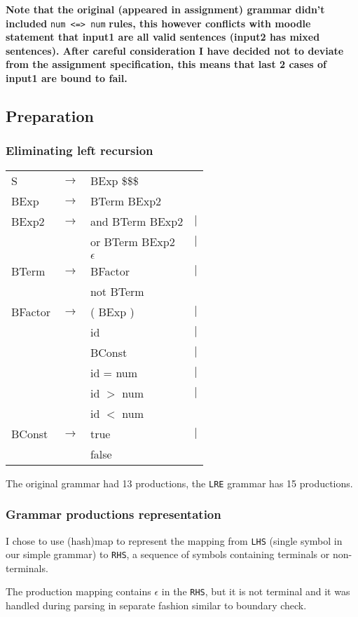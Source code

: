 \documentclass[%
 aip,
 jmp,%
 amsmath,amssymb,
 reprint,%
]{revtex4-1}
\begin{document}
\textbf{Note that the original (appeared in assignment) grammar didn't included }\texttt{num <=> num}\textbf{ rules, this however conflicts with moodle statement that input1 are all valid sentences (input2 has mixed sentences). After careful consideration I have decided not to deviate from the assignment specification, this means that last 2 cases of input1 are bound to fail. }\label{note:rant}
\subsection{Preparation}
\subsubsection{Eliminating left recursion}
\begin{tabular}{lclr}
S	&$\rightarrow$& BExp \$\$\$			&\\
BExp	&$\rightarrow$& BTerm BExp2		&\\
BExp2	&$\rightarrow$& and BTerm BExp2	&$|$\\
		&&		or BTerm	 BExp2			&$|$\\
		&&		$\epsilon$				&\\
BTerm	&$\rightarrow$&	BFactor			&$|$\\
		&&		not BTerm				&\\
BFactor	&$\rightarrow$& ( BExp )			&$|$\\
		&&	   	id						&$|$\\
		&&	   	BConst					&$|$\\
		&&	   	id = num					&$|$\\
		&&	   	id $>$ num				&$|$\\
		&&	   	id $<$ num				&\\
BConst	&$\rightarrow$& true				&$|$\\
		&&	   	false					&
\end{tabular}

The original grammar had 13 productions, the \texttt{LRE} grammar has 15 productions.
\subsubsection{Grammar productions representation}

I chose to use (hash)map to represent the mapping from \texttt{LHS} (single symbol in our simple grammar) to \texttt{RHS}, a sequence of symbols containing terminals or non-terminals. 

The production mapping contains $\epsilon$ in the \texttt{RHS}, but it is not terminal and it was handled during parsing in separate fashion similar to boundary check.
\end{document}
